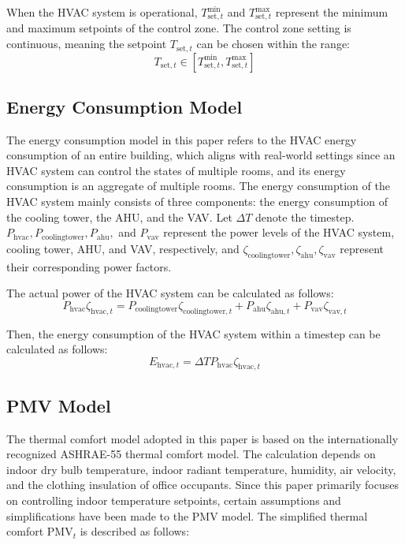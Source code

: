 \documentclass[preprint,12pt]{elsarticle}
\begin{document}
When the HVAC system is operational, $T_{\text{set},t}^{\min}$ and $T_{\text{set},t}^{\max}$ 
represent the minimum and maximum setpoints of the control zone. The control zone setting is continuous, 
meaning the setpoint $T_{\text{set},t}$ can be chosen within the range:
\begin{equation}
T_{\text{set},t} \in \left[ T_{\text{set},t}^{\min}, T_{\text{set},t}^{\max} \right]
\end{equation}

\subsection{Energy Consumption Model}

The energy consumption model in this paper refers to the HVAC energy consumption of an 
entire building, which aligns with real-world settings since an HVAC system can control 
the states of multiple rooms, and its energy consumption is an aggregate of multiple rooms. 
The energy consumption of the HVAC system mainly consists of three components: the energy 
consumption of the cooling tower, the AHU, and the VAV. Let $\Delta T$ denote the timestep. 
$P_{\text{hvac}}, P_{\text{coolingtower}}, P_{\text{ahu}},$ and $P_{\text{vav}}$ represent 
the power levels of the HVAC system, cooling tower, AHU, and VAV, respectively, and $\zeta_{\text{coolingtower}}, 
\zeta_{\text{ahu}}, \zeta_{\text{vav}}$ represent their corresponding power factors.

The actual power of the HVAC system can be calculated as follows:
\begin{equation}
P_{\text{hvac}}\zeta_{\text{hvac},t} = P_{\text{coolingtower}} \zeta_{\text{coolingtower},t} + P_{\text{ahu}} \zeta_{\text{ahu},t} + P_{\text{vav}} \zeta_{\text{vav},t}
\end{equation}

Then, the energy consumption of the HVAC system within a timestep can be calculated as follows:
\begin{equation}
E_{\text{hvac},t} = \Delta T P_{\text{hvac}} \zeta_{\text{hvac},t}
\end{equation}

\subsection{PMV Model}

The thermal comfort model adopted in this paper is based on the internationally 
recognized ASHRAE-55 thermal comfort model. The calculation depends on indoor dry bulb 
temperature, indoor radiant temperature, humidity, air velocity, and the clothing insulation 
of office occupants. Since this paper primarily focuses on controlling indoor temperature setpoints, 
certain assumptions and simplifications have been made to the PMV model. The simplified thermal comfort $\text{PMV}_t$ 
is described as follows:
\end{document}
